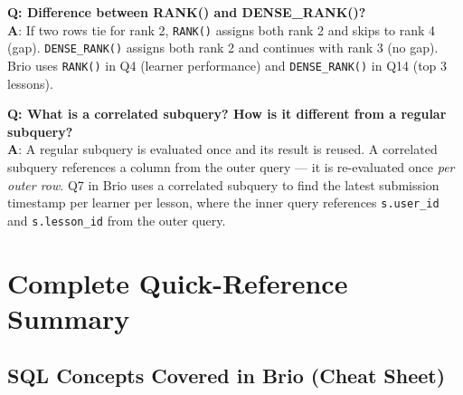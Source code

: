 \documentclass[11pt,a4paper]{article}
\newcommand{\T}[1]{\texttt{#1}}          %
\begin{document}
\begin{qabox}
\textbf{Q: Difference between RANK() and DENSE\_RANK()?}\\
\textbf{A}: If two rows tie for rank 2, \T{RANK()} assigns both rank 2 and skips to
rank 4 (gap). \T{DENSE\_RANK()} assigns both rank 2 and continues with rank 3 (no
gap). Brio uses \T{RANK()} in Q4 (learner performance) and \T{DENSE\_RANK()} in Q14
(top 3 lessons).
\end{qabox}

\begin{qabox}
\textbf{Q: What is a correlated subquery? How is it different from a regular subquery?}\\
\textbf{A}: A regular subquery is evaluated once and its result is reused. A correlated
subquery references a column from the outer query — it is re-evaluated once \textit{per
outer row}. Q7 in Brio uses a correlated subquery to find the latest submission timestamp
per learner per lesson, where the inner query references \T{s.user\_id} and
\T{s.lesson\_id} from the outer query.
\end{qabox}

\section{Complete Quick-Reference Summary}

\subsection{SQL Concepts Covered in Brio (Cheat Sheet)}
\end{document}
